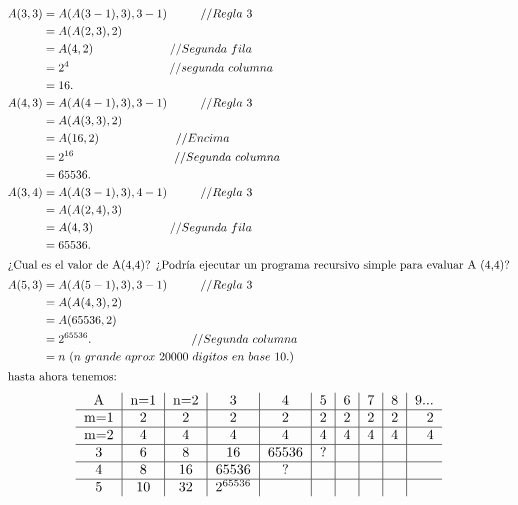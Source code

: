 \documentclass[11pt,a4paper]{article}
\begin{document}
\begin{align*}
            A(3,3) &= A(A(3-1),3),3-1) \hspace*{1cm} // Regla~3\\
                   &= A(A(2,3), 2) \hspace*{2cm} \\
				   &=A(4,2)	\hspace*{2,3cm} // Segunda~fila \\
				   &=2^{4} \hspace*{3cm} // segunda~columna\\
				   &=16.\\
 A(4,3) &= A(A(4-1),3),3-1) \hspace*{1cm} // Regla~3\\
                   &= A(A(3,3), 2) \hspace*{2cm} \\
				   &=A(16,2)	\hspace*{2,3cm} // Encima\\
				   &=2^{16} \hspace*{3cm} // Segunda~columna\\
				   &=65536.\\
 A(3,4) &= A(A(3-1),3),4-1) \hspace*{1cm} // Regla~3\\
                   &= A(A(2,4), 3) \hspace*{2cm} \\
				   &=A(4,3)	\hspace*{2,3cm} // Segunda~fila\\
				   &=65536.\\				   			   
\intertext{¿Cual es el valor de A(4,4)?  
¿Podría ejecutar un programa recursivo simple para evaluar A (4,4)?}
 A(5,3) &= A(A(5-1),3),3-1) \hspace*{1cm} // Regla~3\\
                   &= A(A(4,3), 2) \hspace*{2cm} \\
				   &=A(65536,2)	\hspace*{2,3cm}\\
				   &=2^{65536}.\hspace*{3cm}// Segunda~columna\\
				   &=n~(n~ grande~aprox~20000~digitos~en~base~10.)\\
\intertext{hasta ahora tenemos:}
\end{align*}
\begin{equation*}
\begin{tabular}{ c| c| c| c| c| c| c| c| c| r }
     A & n=1 & n=2 & 3 & 4 & 5 & 6 & 7 & 8 & 9... \\
   \hline
   m=1 & 2 & 2 & 2 & 2 & 2 & 2 & 2 & 2 & 2 \\
   \hline
   m=2 & 4 & 4 & 4 & 4 & 4 & 4 & 4 & 4 & 4 \\
   \hline
   3   & 6 & 8 & 16 & 65536 & ? &  &  &  &  \\
   \hline
   4   & 8 & 16 & 65536 & ? &  &  &  &  &  \\
   \hline
   5  & 10 & 32 & $2^{65536}$ &  &  &  &  &  &  \\
\end{tabular}
\end{equation*}
\end{document}
